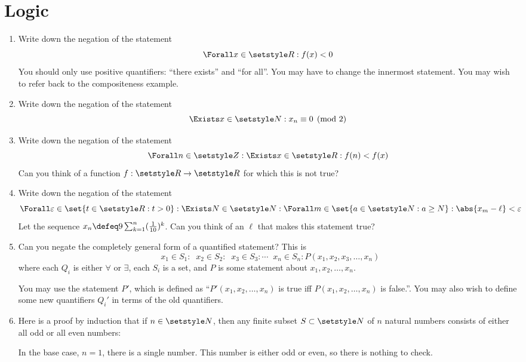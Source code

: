 \section{Logic}

\begin{enumerate}
 \item
  Write down the negation of the statement
  \begin{equation*}
   \Forall x \in \Reals: f(x) < 0
  \end{equation*}
  You should only use positive quantifiers: ``there exists'' and ``for all''.
  You may have to change the innermost statement. You may wish to refer back to
  the compositeness example.
 \item
  Write down the negation of the statement
  \begin{equation*}
   \Exists x \in \Naturals : x_n \equiv 0 \pmod 2
  \end{equation*}
 \item
  Write down the negation of the statement
  \begin{equation*}
   \Forall n \in \Integers :
   \Exists x \in \Reals :
   f(n) < f(x)
  \end{equation*}
  Can you think of a function \(f : \Reals \to \Reals\) for which this is not
  true?
 \item
  Write down the negation of the statement
  \begin{equation*}
   \Forall \epsilon \in \set{t \in \Reals: t > 0} :
   \Exists N \in \Naturals :
   \Forall m \in \set{a \in \Naturals : a \ge N}:
   \abs{x_m - \ell} < \epsilon
  \end{equation*}
  Let the sequence \(x_n \defeq 9\sum_{k = 1}^n(\frac 1{10})^k\). Can you think
  of an \(\ell\) that makes this statement true?
 \item
  Can you negate the completely general form of a quantified statement? This is
  \begin{equation*}
   \mathop{Q_1} x_1 \in S_1 :
   \mathop{Q_2} x_2 \in S_2 :
   \mathop{Q_3} x_3 \in S_3 :
   \dotsb
   \mathop{Q_n} x_n \in S_n :
   P(x_1, x_2, x_3, \dotsc, x_n)
  \end{equation*}
  where each \(Q_i\) is either \(\forall\) or \(\exists\), each \(S_i\) is a
  set, and \(P\) is some statement about \(x_1, x_2, \dotsc, x_n\).

  You may use the statement \(P'\), which is defined as
  ``\(P'(x_1, x_2, \dotsc, x_n)\) is true iff \(P(x_1, x_2, \dotsc, x_n)\) is
  false.''. You may also wish to define some new quantifiers \(Q_i'\) in terms
  of the old quantifiers.
 \item
  Here is a proof by induction that if \(n \in \Naturals\), then any finite
  subset \(S \subset \Naturals\) of \(n\) natural numbers consists of either all
  odd or all even numbers:
  \begin{tcolorbox}
   In the base case, \(n = 1\), there is a single number. This number is either
   odd or even, so there is nothing to check.


\end{tcolorbox}
\end{enumerate}
